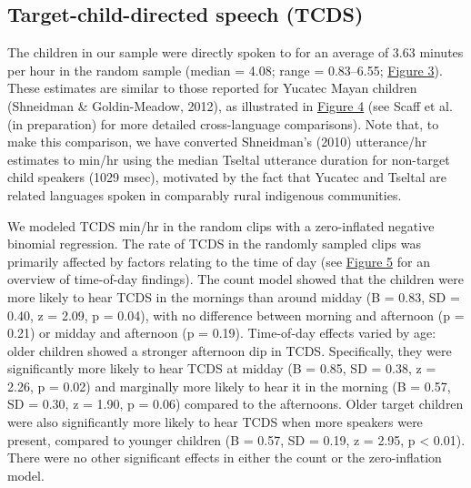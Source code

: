 \documentclass[floatsintext,man]{apa6}
\theoremstyle{definition}
\theoremstyle{definition}
\theoremstyle{definition}
\theoremstyle{remark}
\begin{document}
\subsection{Target-child-directed speech
(TCDS)}\label{target-child-directed-speech-tcds}

The children in our sample were directly spoken to for an average of
3.63 minutes per hour in the random sample (median = 4.08; range =
0.83--6.55; \protect\hyperlink{fig3}{Figure 3}). These estimates are
similar to those reported for Yucatec Mayan children (Shneidman \&
Goldin-Meadow, 2012), as illustrated in \protect\hyperlink{fig4}{Figure
4} (see Scaff et al. (in preparation) for more detailed cross-language
comparisons). Note that, to make this comparison, we have converted
Shneidman's (2010) utterance/hr estimates to min/hr using the median
Tseltal utterance duration for non-target child speakers (1029 msec),
motivated by the fact that Yucatec and Tseltal are related languages
spoken in comparably rural indigenous communities.

We modeled TCDS min/hr in the random clips with a zero-inflated negative
binomial regression. The rate of TCDS in the randomly sampled clips was
primarily affected by factors relating to the time of day (see
\protect\hyperlink{fig5}{Figure 5} for an overview of time-of-day
findings). The count model showed that the children were more likely to
hear TCDS in the mornings than around midday (B = 0.83, SD = 0.40, z =
2.09, p = 0.04), with no difference between morning and afternoon (p =
0.21) or midday and afternoon (p = 0.19). Time-of-day effects varied by
age: older children showed a stronger afternoon dip in TCDS.
Specifically, they were significantly more likely to hear TCDS at midday
(B = 0.85, SD = 0.38, z = 2.26, p = 0.02) and marginally more likely to
hear it in the morning (B = 0.57, SD = 0.30, z = 1.90, p = 0.06)
compared to the afternoons. Older target children were also
significantly more likely to hear TCDS when more speakers were present,
compared to younger children (B = 0.57, SD = 0.19, z = 2.95, p
\textless{} 0.01). There were no other significant effects in either the
count or the zero-inflation model.
\end{document}
